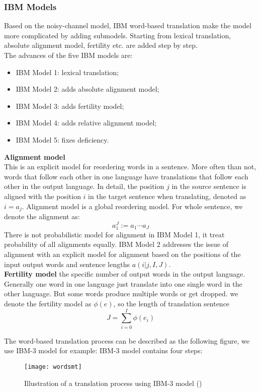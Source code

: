 \subsubsection{IBM Models}
Based on the noisy-channel model, IBM word-based translation make the model more complicated by adding submodels. Starting from lexical translation, absolute alignment model, fertility etc. are added step by step.\\
The advances of the five IBM models are:
\begin{itemize}
	\item IBM Model 1: lexical translation;
	\item IBM Model 2: adds absolute alignment model;
	\item IBM Model 3: adds fertility model;
	\item IBM Model 4: adds relative alignment model;
	\item IBM Model 5: fixes deficiency.
\end{itemize}
 \textbf{Alignment model} \\
 This is an explicit model for reordering words in a sentence. More often than not, words that follow each other in one language have translations  that follow each other in the output language. In detail, the position $j$ in the source sentence is aligned with the position $i$ in the target sentence when translating, denoted as  ${i=a_j}$. Alignment model is a global reordering model. For whole sentence, we denote the alignment as: 
\[a_1^J:= a_1\cdots a_J\]
There is not probabilistic model for alignment in IBM Model 1, it treat probability of all alignments equally. IBM Model 2 addresses the issue of alignment with an explicit model for alignment based on the positions of the input output words and sentence lengths $a(i|j, I, J)$. \\
\textbf{Fertility model} the specific number of output words in the output language. Generally one word in one language just translate into one single word in the other language. But some words produce multiple words or get dropped. we denote the fertility model as $\phi(e)$, so the length of translation sentence  
\[ J = \sum_{i=0}^{I} \phi(e_i) \]

The word-based translation process can be described as the following figure, we use IBM-3 model for example:  
IBM-3 model contains four steps: 
\begin{figure}[t]
	\texttt{[image: wordsmt]}
	\caption{ Illustration of a translation process using IBM-3 model (\cite{koehn2009statistical})}
	\centering
\end{figure}




